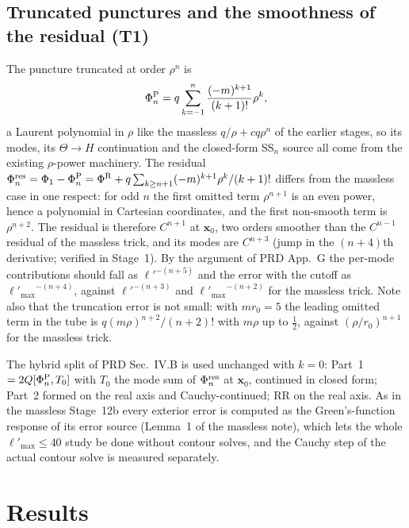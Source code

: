 \documentclass[11pt,a4paper]{article}
\newcommand{\x}{\mathbf{x}}
\newcommand{\PhiP}{\Phi^{\rm P}}
\newcommand{\PhiR}{\Phi^{\rm R}}
\newcommand{\Pres}{\Phi^{\rm res}}
\newcommand{\lpm}{{\ell'_{\max}}}
\begin{document}
\subsection{Truncated punctures and the smoothness of the residual (T1)}\label{sec:trunc}
The puncture truncated at order $\rho^n$ is
\begin{equation}
\PhiP_n=q\sum_{k=-1}^{n}\frac{(-m)^{k+1}}{(k+1)!}\rho^k ,
\end{equation}
a Laurent polynomial in $\rho$ like the massless $q/\rho+cq\rho^n$ of the earlier stages, so its modes, its $\Theta\to H$ continuation and the closed-form SS$_n$ source all come from the existing $\rho$-power machinery.
The residual $\Pres_n=\Phi_1-\PhiP_n=\PhiR+q\sum_{k\ge n+1}(-m)^{k+1}\rho^k/(k+1)!$ differs from the massless case in one respect: for odd $n$ the first omitted term $\rho^{n+1}$ is an even power, hence a polynomial in Cartesian coordinates, and the first non-smooth term is $\rho^{n+2}$.
The residual is therefore $C^{n+1}$ at $\x_0$, two orders smoother than the $C^{n-1}$ residual of the massless trick, and its modes are $C^{n+3}$ (jump in the $(n+4)$th derivative; verified in Stage~1).
By the argument of PRD App.~G the per-mode contributions should fall as $\ell'^{-(n+5)}$ and the error with the cutoff as $\lpm^{-(n+4)}$, against $\ell'^{-(n+3)}$ and $\lpm^{-(n+2)}$ for the massless trick.
Note also that the truncation error is not small: with $mr_0=5$ the leading omitted term in the tube is $q(m\rho)^{n+2}/(n+2)!$ with $m\rho$ up to $\tfrac12$, against $(\rho/r_0)^{n+1}$ for the massless trick.

The hybrid split of PRD Sec.~IV.B is used unchanged with $k=0$: Part~1 $=2Q[\PhiP_n,T_0]$ with $T_0$ the mode sum of $\Pres_n$ at $\x_0$, continued in closed form; Part~2 formed on the real axis and Cauchy-continued; RR on the real axis.
As in the massless Stage~12b every exterior error is computed as the Green's-function response of its error source (Lemma~1 of the massless note), which lets the whole $\lpm\le40$ study be done without contour solves, and the Cauchy step of the actual contour solve is measured separately.

\section{Results}\label{sec:results}
\end{document}
